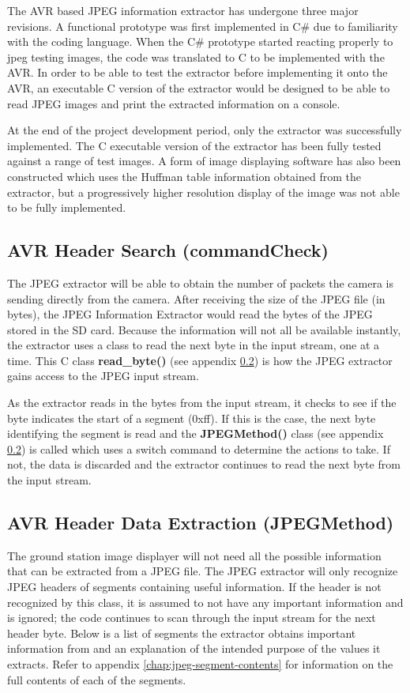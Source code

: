 The AVR based JPEG information extractor has undergone
three major revisions. A functional prototype was first
implemented in C\# due to familiarity with the coding language.
When the C\# prototype started reacting properly to 
jpeg testing images, the code was translated to C to be
implemented with the AVR. In order to be able to test
the extractor before implementing it onto the AVR, an 
executable C version of the extractor would be designed
to be able to read JPEG images and print the extracted
information on a console.

At the end of the project development period, only the 
extractor was successfully implemented. The C executable 
version of the extractor has been fully tested against 
a range of test images. A form of image displaying 
software has also been constructed which uses the 
Huffman table information obtained from the extractor, 
but a progressively higher resolution display of 
the image was not able to be fully implemented.

\subsection{AVR Header Search (commandCheck)}

The JPEG extractor will be able to obtain the 
number of packets the camera is sending directly from the camera.
After receiving the size of the JPEG file (in bytes), 
the JPEG Information Extractor would read the bytes of the JPEG stored in the SD card. 
Because the information will not all be available instantly, 
the extractor uses a class to read the next byte in the input stream, one at a time. 
This C class \textbf{read\_byte()} (see appendix \ref{}) is how the JPEG extractor 
gains access to the JPEG input stream. 

As the extractor reads in the bytes from the input stream, it checks to see if the byte indicates the start of a segment (0xff). 
If this is the case, the next byte identifying the segment is read and the \textbf{JPEGMethod()} class  (see appendix \ref{}) is 
called which uses a switch command to determine the actions to take. 
If not, the data is discarded and the extractor continues 
to read the next byte from the input stream. 

\subsection{AVR Header Data Extraction (JPEGMethod)}

The ground station image displayer will not need all the possible information that can be extracted from a JPEG file. 
The JPEG extractor will only recognize JPEG headers of segments containing useful information.
If the header is not recognized by this class, 
it is assumed to not have any important information and is ignored; 
the code continues to scan through the input stream for the next header byte. 
Below is a list of segments the extractor obtains important information from 
and an explanation of the intended purpose of the values it extracts. 
Refer to appendix \ref{chap:jpeg-segment-contents} for information on the full contents of each
of the segments.

